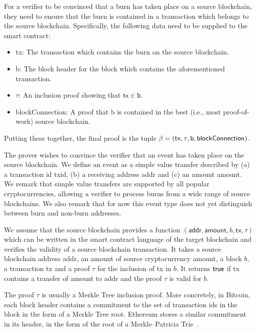 For a verifier to be convinced that a burn has taken place on a source blockchain, they need to ensure that the burn is contained in a transaction which belongs to the source blockchain. Specifically, the following data need to be supplied to the smart contract:

\begin{itemize}
  \item \textsf{tx}: The transaction which contains the burn on the source blockchain.
  \item \textsf{b}: The block header for the block which contains the aforementioned transaction.
  \item $\tau$: An inclusion proof showing that $\mathsf{tx} \in \mathsf{b}$.
  \item \textsf{blockConnection}: A proof that \textsf{b} is contained in the best (i.e., most proof-of-work) source blockchain.
\end{itemize}

Putting these together, the final proof is the tuple $\beta = \sf(tx, \tau, b, block\-Connection)$.

The prover wishes to convince the verifier that an event has taken place on the source blockchain. We define an event as a simple value transfer described by (a) a transaction id \textsf{txid}, (b) a receiving address \textsf{addr} and (c) an amount \textsf{amount}. We remark that simple value transfers are supported by all popular cryptocurrencies, allowing a verifier to process burns from a wide range of source blockchains. We also remark that for now this event type does not yet distinguish between burn and non-burn addresses.

We assume that the source blockchain provides a function \verifytx$(\textsf{addr}, \textsf{amount}, b, \textsf{tx}, \tau)$ which can be written in the smart contract language of the target blockchain and verifies the validity of a source blockchain transaction. It takes a source blockchain address \textsf{addr}, an amount of source cryptocurrency \textsf{amount}, a block $b$, a transaction \textsf{tx} and a proof $\tau$ for the inclusion of \textsf{tx} in $b$. It returns $\mathsf{true}$ if \textsf{tx} contains a transfer of \textsf{amount} to \textsf{addr} and the proof $\tau$ is valid for $b$.

The proof $\tau$ is usually a Merkle Tree inclusion proof. More concretely, in Bitcoin, each block header contains a commitment to the set of transaction ids in the block in the form of a Merkle Tree root. Ethereum stores a similar commitment in its header, in the form of the root of a Merkle--Patricia Trie~\cite{wood2014ethereum}.


